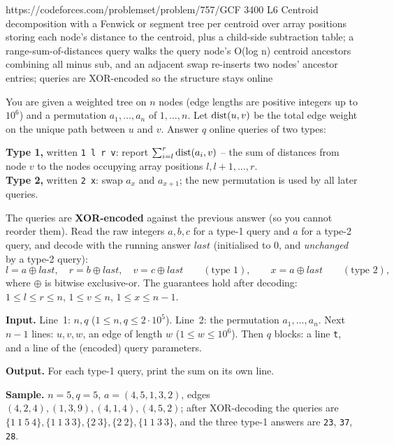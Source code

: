   {https://codeforces.com/problemset/problem/757/G}{CF 3400 L6}
  {Centroid decomposition with a Fenwick or segment tree per centroid over array positions storing each node's distance to the centroid, plus a child-side subtraction table; a range-sum-of-distances query walks the query node's O(log n) centroid ancestors combining all minus sub, and an adjacent swap re-inserts two nodes' ancestor entries; queries are XOR-encoded so the structure stays online}

\begin{problemstatement}
You are given a weighted tree on \(n\) nodes (edge lengths are positive integers up to
\(10^6\)) and a permutation \(a_1,\dots,a_n\) of \(1,\dots,n\). Let \(\operatorname{dist}(u,v)\) be the total
edge weight on the unique path between \(u\) and \(v\). Answer \(q\) online queries of two types:

\textbf{Type 1,} written \texttt{1 l r v}: report \(\sum_{i=l}^{r} \operatorname{dist}(a_i, v)\) -- the sum of
distances from node \(v\) to the nodes occupying array positions \(l, l+1, \dots, r\).\\
\textbf{Type 2,} written \texttt{2 x}: swap \(a_x\) and \(a_{x+1}\); the new permutation is used by
all later queries.

The queries are \textbf{XOR-encoded} against the previous answer (so you cannot reorder them). Read
the raw integers \(a,b,c\) for a type-1 query and \(a\) for a type-2 query, and decode with the
running answer \(\mathit{last}\) (initialised to \(0\), and \emph{unchanged} by a type-2 query):
\[
  l = a \oplus \mathit{last},\quad r = b \oplus \mathit{last},\quad v = c \oplus \mathit{last}
  \qquad(\text{type }1),\qquad x = a \oplus \mathit{last}\qquad(\text{type }2),
\]
where \(\oplus\) is bitwise exclusive-or. The guarantees hold after decoding:
\(1\le l\le r\le n\), \(1\le v\le n\), \(1\le x\le n-1\).

\textbf{Input.} Line~1: \(n, q\) (\(1\le n,q\le 2\cdot10^5\)). Line~2: the permutation
\(a_1,\dots,a_n\). Next \(n-1\) lines: \(u, v, w\), an edge of length \(w\) (\(1\le w\le 10^6\)).
Then \(q\) blocks: a line \texttt{t}, and a line of the (encoded) query parameters.

\textbf{Output.} For each type-1 query, print the sum on its own line.

\textbf{Sample.} \(n{=}5,q{=}5\), \(a=(4,5,1,3,2)\), edges \((4,2,4),(1,3,9),(4,1,4),(4,5,2)\);
after XOR-decoding the queries are \(\{1\ 1\ 5\ 4\}, \{1\ 1\ 3\ 3\}, \{2\ 3\}, \{2\ 2\},
\{1\ 1\ 3\ 3\}\), and the three type-1 answers are \texttt{23}, \texttt{37}, \texttt{28}.
\end{problemstatement}

